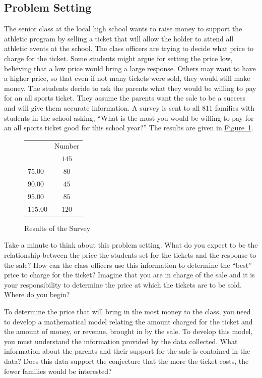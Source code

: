 \documentclass[10pt,]{book}
\theoremstyle{ptxdefinitionnotitle}
\theoremstyle{ptxdefinitiontitle}
\numberwithin{equation}{section}
\newcommand{\hrulemedium}{\noalign{\hrule height 0.07em}}
\begin{document}
\subsection[{Problem Setting}]{Problem Setting}\label{subsection-1}
\hypertarget{p-14}{}%
The senior class at the local high school wants to raise money to support the athletic program by selling a ticket that will allow the holder to attend all athletic events at the school. The class officers are trying to decide what price to charge for the ticket. Some students might argue for setting the price low, believing that a low price would bring a large response. Others may want to have a higher price, so that even if not many tickets were sold, they would still make money. The students decide to ask the parents what they would be willing to pay for an all sports ticket. They assume the parents want the sale to be a success and will give them accurate information. A survey is sent to all 811 families with students in the school asking, “What is the most you would be willing to pay for an all sports ticket good for this school year?” The results are given in \hyperref[results-of-the-survey]{Figure~1}.%
\begin{figure}
\centering
\begin{tabular}{cc}\hrulemedium
\multicolumn{1}{l}{Maximum Price (\textdollar{})}&\multicolumn{1}{l}{Number}\tabularnewline\hrulemedium
\multicolumn{1}{l}{\(50.00\)}&\(145\)\tabularnewline[0pt]
\multicolumn{1}{l}{\(75.00\)}&\(80\)\tabularnewline[0pt]
\multicolumn{1}{l}{\(90.00\)}&\(45\)\tabularnewline[0pt]
\multicolumn{1}{l}{\(95.00\)}&\(85\)\tabularnewline[0pt]
\multicolumn{1}{l}{\(115.00\)}&\(120\)
\end{tabular}
\caption{Results of the Survey\label{results-of-the-survey}}
\end{figure}
\hypertarget{p-15}{}%
Take a minute to think about this problem setting. What do you expect to be the relationship between the price the students set for the tickets and the response to the sale? How can the class officers use this information to determine the “best” price to charge for the ticket? Imagine that you are in charge of the sale and it is your responsibility to determine the price at which the tickets are to be sold. Where do you begin?%
\par
\hypertarget{p-16}{}%
To determine the price that will bring in the most money to the class, you need to develop a mathematical model relating the amount charged for the ticket and the amount of money, or revenue, brought in by the sale. To develop this model, you must understand the information provided by the data collected. What information about the parents and their support for the sale is contained in the data? Does this data support the conjecture that the more the ticket costs, the fewer families would be interested?%
\end{document}
